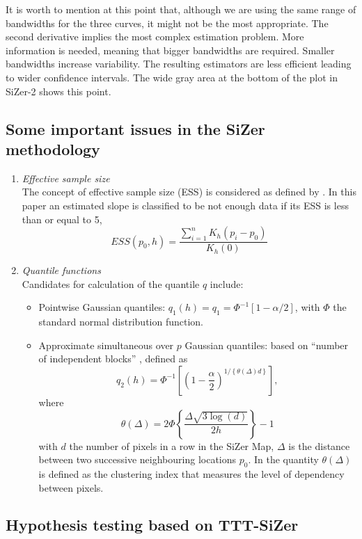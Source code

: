 \documentclass[preprint,12pt]{elsarticle}
\begin{document}
It is worth to mention at this point that, although we are using the same range of bandwidths for the three curves, it might not be the most appropriate. The second derivative implies the most complex estimation problem. More information is needed, meaning that bigger bandwidths are required. Smaller bandwidths increase variability. The resulting estimators are less efficient leading to wider confidence intervals. The wide gray area at the bottom of the plot in SiZer-2 shows this point.


\subsection{Some important issues in the SiZer methodology}
\begin{enumerate}
\item {\it Effective sample size} \\
\noindent The  concept of effective sample size (ESS) is considered as defined by \cite{CM99}. In this paper an estimated slope is classified to be not enough data if its ESS is less than or equal to 5, 
$$
ESS(p_0,h) = \frac{\sum_{i=1}^n K_h(p_i-p_0)}{K_h(0)}
$$
\item {\it Quantile functions} \\
\noindent Candidates for calculation of the quantile $q$ include:
\begin{itemize}
	\item Pointwise Gaussian quantiles: $q_1(h) = q_1 = \Phi^{-1}[1-\alpha/2]$, with $\Phi$ the standard normal distribution function. 
	\item Approximate simultaneous over $p$ Gaussian quantiles: based on ``number of independent blocks'' \cite{HM2006}, defined as
	$$
	q_2(h) = \Phi^{-1} \left[\left(1- \frac{\alpha}{2}\right)^{1/\left\{\theta(\Delta)d\right\}}\right],
	$$
	where
	$$
	\theta(\Delta) =2 \Phi \left\{ \frac{\Delta \sqrt{3 \log(d)}}{2h}\right\}-1
	$$
	with $d$ the number of pixels in a row in the SiZer Map, $\Delta$ is the distance between two successive neighbouring locations $p_0$. In \cite{HM2006} the quantity $\theta(\Delta)$ is defined as the clustering index that measures the level of dependency between pixels. 
\end{itemize}
\end{enumerate}

\subsection{Hypothesis testing based on TTT-SiZer}
\end{document}
